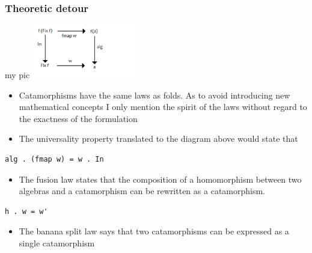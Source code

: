 \documentclass[10pt]{beamer}
\begin{document}
\begin{frame}[fragile]
\frametitle{Theoretic detour}

\begin{block}{my pic}
\includegraphics[width=0.34\textwidth]{graf3.png}	
\end{block}
\begin{itemize}
\item Catamorphisms have the same laws as folds. As to avoid introducing new mathematical concepts I only mention the 
	spirit of the laws without regard to the exactness of the formulation 
\item The universality property translated to the diagram above would state that

\end{itemize}

\begin{lstlisting}
alg . (fmap w) = w . In
\end{lstlisting}

\begin{itemize}
\item The fusion law states that the composition of a homomorphism between two algebras and a catamorphism can be rewritten as a catamorphism.
\end{itemize}

\begin{lstlisting}
h . w = w'
\end{lstlisting}

\begin{itemize}
\item The banana split law says that two catamorphisms can be expressed as a single catamorphism 
\end{itemize}
\end{frame}
\end{document}
